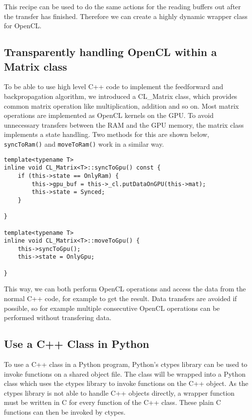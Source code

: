 \documentclass{acm_proc_article-sp}
\begin{document}
This recipe can be used to do the same actions for the reading buffers out after the transfer has finished.
Therefore we can create a highly dynamic wrapper class for OpenCL.

\subsection{Transparently handling OpenCL within a Matrix class}

To be able to use high level C++ code to implement the feedforward and backpropagation algorithm, we introduced a CL\_Matrix class, which provides common matrix operation like multiplication, addition and so on. Most matrix operations are implemented as OpenCL kernels on the GPU. To avoid unnecessary transfers between the RAM and the GPU memory, the matrix class implements a state handling. Two methods for this are shown below, \texttt{syncToRam()} and \texttt{moveToRam()} work in a similar way.

\begin{lstlisting}[caption=State handling to allow the Matrix data to be both used in RAM and in the GPU memory]
template<typename T>
inline void CL_Matrix<T>::syncToGpu() const {
    if (this->state == OnlyRam) {
        this->gpu_buf = this->_cl.putDataOnGPU(this->mat);
        this->state = Synced;
    }

}

template<typename T>
inline void CL_Matrix<T>::moveToGpu() {
    this->syncToGpu();
    this->state = OnlyGpu;

}
\end{lstlisting}

This way, we can both perform OpenCL operations and access the data from the normal C++ code, for example to get the result. Data transfers are avoided if possible, so for example multiple consecutive OpenCL operations can be performed without transfering data.

\subsection{Use a C++ Class in Python}
To use a C++ class in a Python program, Python's ctypes library can be used to invoke functions on a shared object file. The class will be wrapped into a Python class which uses the ctypes library to invoke functions on the C++ object. As the ctypes library is not able to handle C++ objects directly, a wrapper function must be written in C for every function of the C++ class. These plain C functions can then be invoked by ctypes.
\end{document}
